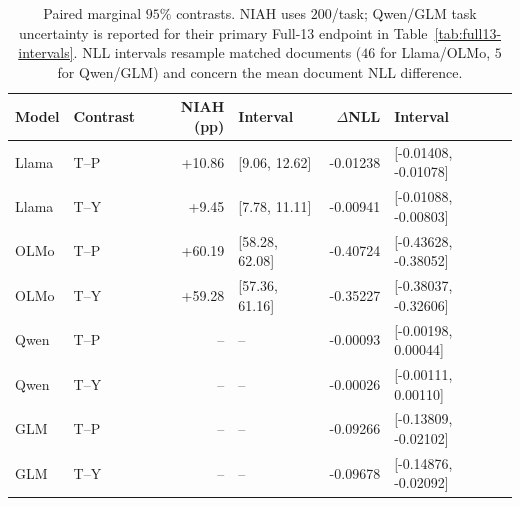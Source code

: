 \begin{table}[ht]
\centering\small
\caption{Paired marginal $95\%$ contrasts. NIAH uses $200$/task; Qwen/GLM task uncertainty is reported for their primary Full-13 endpoint in Table~\ref{tab:full13-intervals}. NLL intervals resample matched documents ($46$ for Llama/OLMo, $5$ for Qwen/GLM) and concern the mean document NLL difference.}
\label{tab:three-method-intervals}
\begin{tabular}{@{}llrlrl@{}}
\toprule
Model & Contrast & NIAH (pp) & Interval & $\Delta$NLL & Interval \\
\midrule
Llama & T--P & +10.86 & [9.06, 12.62] & -0.01238 & [-0.01408, -0.01078] \\
Llama & T--Y & +9.45 & [7.78, 11.11] & -0.00941 & [-0.01088, -0.00803] \\
OLMo & T--P & +60.19 & [58.28, 62.08] & -0.40724 & [-0.43628, -0.38052] \\
OLMo & T--Y & +59.28 & [57.36, 61.16] & -0.35227 & [-0.38037, -0.32606] \\
Qwen & T--P & -- & -- & -0.00093 & [-0.00198, 0.00044] \\
Qwen & T--Y & -- & -- & -0.00026 & [-0.00111, 0.00110] \\
GLM & T--P & -- & -- & -0.09266 & [-0.13809, -0.02102] \\
GLM & T--Y & -- & -- & -0.09678 & [-0.14876, -0.02092] \\
\bottomrule
\end{tabular}
\end{table}
